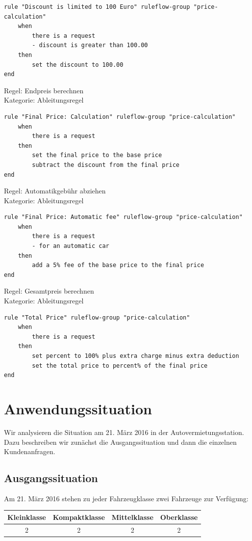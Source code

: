 \begin{lstlisting}
rule "Discount is limited to 100 Euro" ruleflow-group "price-calculation"
	when
		there is a request
		- discount is greater than 100.00
	then
		set the discount to 100.00
end
\end{lstlisting}

Regel: Endpreis berechnen \\
Kategorie: Ableitungsregel

\begin{lstlisting}
rule "Final Price: Calculation" ruleflow-group "price-calculation"
	when
		there is a request
	then
		set the final price to the base price
		subtract the discount from the final price
end
\end{lstlisting}

Regel: Automatikgebühr abziehen \\
Kategorie: Ableitungsregel

\begin{lstlisting}
rule "Final Price: Automatic fee" ruleflow-group "price-calculation"
	when
		there is a request
		- for an automatic car
	then
		add a 5% fee of the base price to the final price
end
\end{lstlisting}

Regel: Gesamtpreis berechnen \\
Kategorie: Ableitungsregel

\begin{lstlisting}
rule "Total Price" ruleflow-group "price-calculation"
	when
		there is a request
	then
		set percent to 100% plus extra charge minus extra deduction
		set the total price to percent% of the final price
end
\end{lstlisting}

\section{Anwendungssituation}

Wir analysieren die Situation am 21. März 2016 in der Autovermietungsstation.
Dazu beschreiben wir zunächst die Ausgangssituation und dann die einzelnen Kundenanfragen.

\subsection{Ausgangssituation}

Am 21. März 2016 stehen zu jeder Fahrzeugklasse zwei Fahrzeuge zur Verfügung:

\begin{tabular}{|c|c|c|c|}
	\hline \textbf{Kleinklasse} & \textbf{Kompaktklasse} & \textbf{Mittelklasse} & \textbf{Oberklasse}  \\ 
	\hline 2 & 2 & 2 & 2 \\ 
	\hline 
\end{tabular} 

